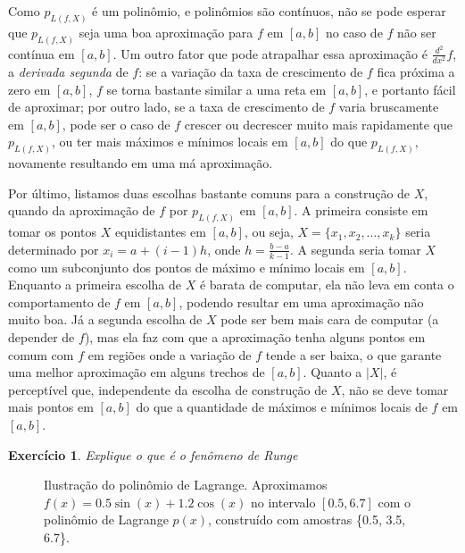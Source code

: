 \documentclass[]{article}
\newtheorem{exercicio}{Exercício}
\numberwithin{equation}{section}
\begin{document}
Como $p_{L(f, X)}$ é um polinômio, e polinômios são contínuos, não se pode esperar que $p_{L(f, X)}$ seja uma boa aproximação para $f$ em $[a, b]$ no caso de $f$ não ser contínua em $[a, b]$. Um outro fator que pode atrapalhar essa aproximação é $\frac{d^2}{dx^2} f$, a \emph{derivada segunda} de $f$: se a variação da taxa de crescimento de $f$ fica próxima a zero em $[a, b]$, $f$ se torna bastante similar a uma reta em $[a, b]$, e portanto fácil de aproximar; por outro lado, se a taxa de crescimento de $f$ varia bruscamente em $[a, b]$, pode ser o caso de $f$ crescer ou decrescer muito mais rapidamente que $p_{L(f, X)}$, ou ter mais máximos e mínimos locais em $[a, b]$ do que $p_{L(f, X)}$, novamente resultando em uma má aproximação.

Por último, listamos duas escolhas bastante comuns para a construção de $X$, quando da aproximação de $f$ por $p_{L(f, X)}$ em $[a, b]$. A primeira consiste em tomar os pontos $X$ equidistantes em $[a, b]$, ou seja, $X = \{x_1, x_2, \dots, x_k\}$ seria determinado por $x_i = a + (i - 1)h$, onde $h = \frac{b - a}{k - 1}$. A segunda seria tomar $X$ como um subconjunto dos pontos de máximo e mínimo locais em $[a, b]$. Enquanto a primeira escolha de $X$ é barata de computar, ela não leva em conta o comportamento de $f$ em $[a, b]$, podendo resultar em uma aproximação não muito boa. Já a segunda escolha de $X$ pode ser bem mais cara de computar (a depender de $f$), mas ela faz com que a aproximação tenha alguns pontos em comum com $f$ em regiões onde a variação de $f$ tende a ser baixa, o que garante uma melhor aproximação em alguns trechos de $[a, b]$. Quanto a $|X|$, é perceptível que, independente da escolha de construção de $X$, não se deve tomar mais pontos em $[a, b]$ do que a quantidade de máximos e mínimos locais de $f$ em $[a, b]$.

\begin{exercicio} \label{exercicioFenomenoRunge}
	Explique o que é o \emph{fenômeno de Runge}
\end{exercicio}

\begin{figure}
  \centering
  \caption{Ilustração do polinômio de Lagrange. Aproximamos
    $f(x) = 0.5\sin(x) + 1.2\cos(x)$ no intervalo $[0.5, 6.7]$ com o
    polinômio de Lagrange $p(x)$, construído com amostras \{0.5, 3.5,
    6.7\}.}
\end{figure}
\end{document}
